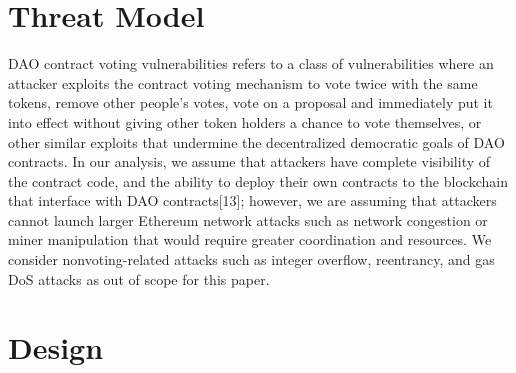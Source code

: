 \documentclass[conference]{IEEEtran}
\begin{document}
\section{Threat Model}
DAO contract voting vulnerabilities refers to a class of vulnerabilities where an attacker exploits the contract voting mechanism to vote twice with the same tokens, remove other people's votes, vote on a proposal and immediately put it into effect without giving other token holders a chance to vote themselves, or other similar exploits that undermine the decentralized democratic goals of DAO contracts. In our analysis, we assume that attackers have complete visibility of the contract code, and the ability to deploy their own contracts to the blockchain that interface with DAO contracts[13]; however, we are assuming that attackers cannot launch larger Ethereum network attacks such as network congestion or miner manipulation that would require greater coordination and resources. We consider nonvoting-related attacks such as integer overflow, reentrancy, and gas DoS attacks as out of scope for this paper. 

\section{Design}
\end{document}

